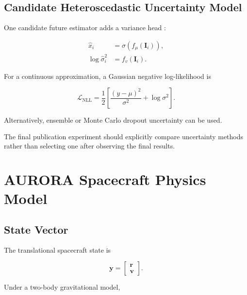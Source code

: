 \documentclass[11pt,a4paper]{article}
\newcommand{\vect}[1]{\bm{#1}}
\begin{document}

\subsection{Candidate Heteroscedastic Uncertainty Model}

One candidate future estimator adds a variance head
\cite{kendall2017}:

\begin{align}
\hat{x}_i
&=
\sigma(f_\mu(\vect I_i)),\\
\log \hat{\sigma}_{i}^{2}
&=
f_v(\vect I_i).
\end{align}

For a continuous approximation, a Gaussian negative log-likelihood is

\begin{equation}
\mathcal L_{\mathrm{NLL}}
=
\frac{1}{2}
\left[
\frac{
(y-\mu)^2
}{
\sigma^2
}
+
\log\sigma^2
\right].
\end{equation}

Alternatively, ensemble or Monte Carlo dropout uncertainty can be
used.

The final publication experiment should explicitly compare uncertainty
methods rather than selecting one after observing the final results.


\section{AURORA Spacecraft Physics Model}

\subsection{State Vector}

The translational spacecraft state is

\begin{equation}
\vect y
=
\begin{bmatrix}
\vect r\\
\vect v
\end{bmatrix}.
\end{equation}

Under a two-body gravitational model,
\end{document}
